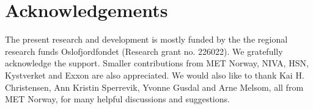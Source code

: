 \documentclass[12pt,a4paper,english]{article}
\begin{document}
\clearpage
\pagestyle{plain}












\clearpage
\section*{\hspace{17mm}Acknowledgements}
The present research and development is mostly funded by the the regional research funds Oslofjordfondet (Research grant no. 226022). We gratefully acknowledge the support. Smaller contributions from MET Norway, NIVA, HSN, Kystverket and Exxon are also appreciated. We would also like to thank Kai H. Christensen, Ann Kristin Sperrevik, Yvonne Gusdal and Arne Melsom, all from MET Norway, for many helpful discussions and suggestions.   




\clearpage
\pagebreak



\clearpage
\pagebreak
 
\end{document}
